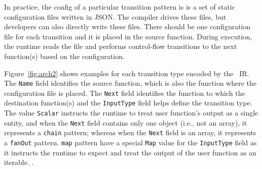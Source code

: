 In practice, the \name{} config of a particular transition pattern is  is a set of static configuration
files written in JSON. The compiler drives these files, but developers can also directly write these files. 
There should be one configuration file for each transition and it
is placed in the source function. During
execution, the \name{} runtime reads the file and performs control-flow
transitions to the next function(s) based on the configuration.


Figure~\ref{fig:arch2} shows examples for each transition type encoded
by the \name{}~IR. The \texttt{Name} field identifies the source function, which is also the function where the
configuration file is placed. The \texttt{Next} field identifies the function
to which the destination function(s) and the
\texttt{InputType} field helps define the transition type. The value
\texttt{Scalar} instructs the runtime to treat user function's output as a
single entity, and when the \texttt{Next} field contains only one object
(i.e., not an array), it represents a \texttt{chain} pattern; whereas when the
\texttt{Next} field is an array, it represents a \texttt{fanOut} pattern.
\texttt{map} pattern have a special \texttt{Map} value for the
\texttt{InputType} field as it instructs the runtime to expect and treat the
output of the user function as an iterable. .








